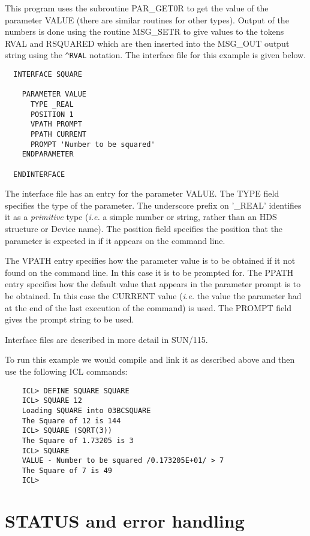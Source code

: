 This program uses the subroutine PAR\_GET0R to get the value of the parameter
VALUE (there are similar routines for other types). Output of the numbers
is done using the routine MSG\_SETR to give values to the tokens RVAL and
RSQUARED which are then inserted into the MSG\_OUT output string using
the \verb$^RVAL$ notation. The interface file for this example is given
below.        

\begin{verbatim}
  INTERFACE SQUARE
 
    PARAMETER VALUE
      TYPE _REAL
      POSITION 1
      VPATH PROMPT
      PPATH CURRENT
      PROMPT 'Number to be squared'
    ENDPARAMETER

  ENDINTERFACE
\end{verbatim}               

The interface file has an entry for the parameter VALUE. The TYPE field
specifies the type of the parameter. The underscore prefix on '\_REAL'
identifies it as a {\em primitive} type ({\em i.e.} a simple number or string,
rather than an HDS structure or Device name). The position field specifies
the position that the parameter is expected in if it appears on the command
line.

The VPATH entry specifies how the parameter value is to be obtained if it
not found on the command line. In this case it is to be prompted for. The
PPATH entry specifies how the default value that appears in the parameter
prompt is to be obtained. In this case the CURRENT value ({\em i.e.} the value
the parameter had at the end of the last execution of the command) is used.
The PROMPT field gives the prompt string to be used.

Interface files are described in more detail in SUN/115.
                                                      
To run this example we would compile and link it as described above and
then use the following ICL commands:

\begin{verbatim}
    ICL> DEFINE SQUARE SQUARE
    ICL> SQUARE 12
    Loading SQUARE into 03BCSQUARE
    The Square of 12 is 144
    ICL> SQUARE (SQRT(3))
    The Square of 1.73205 is 3
    ICL> SQUARE
    VALUE - Number to be squared /0.173205E+01/ > 7
    The Square of 7 is 49
    ICL>         
\end{verbatim}

\section{STATUS and error handling}

